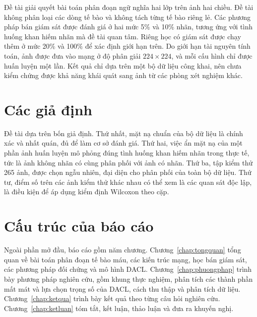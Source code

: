 Đề tài giải quyết bài toán phân đoạn ngữ nghĩa hai lớp trên ảnh hai chiều. Đề tài không phân loại các dòng tế bào và không tách từng tế bào riêng lẻ. Các phương pháp bán giám sát được đánh giá ở hai mức 5\% và 10\% nhãn, tương ứng với tình huống khan hiếm nhãn mà đề tài quan tâm. Riêng học có giám sát được chạy thêm ở mức 20\% và 100\% để xác định giới hạn trên. Do giới hạn tài nguyên tính toán, ảnh được đưa vào mạng ở độ phân giải $224\times224$, và mỗi cấu hình chỉ được huấn luyện một lần. Kết quả chỉ dựa trên một bộ dữ liệu công khai, nên chưa kiểm chứng được khả năng khái quát sang ảnh từ các phòng xét nghiệm khác.

\section{Các giả định}

Đề tài dựa trên bốn giả định. Thứ nhất, mặt nạ chuẩn của bộ dữ liệu là chính xác và nhất quán, đủ để làm cơ sở đánh giá. Thứ hai, việc ẩn mặt nạ của một phần ảnh huấn luyện mô phỏng đúng tình huống khan hiếm nhãn trong thực tế, tức là ảnh không nhãn có cùng phân phối với ảnh có nhãn. Thứ ba, tập kiểm thử 265 ảnh, được chọn ngẫu nhiên, đại diện cho phân phối của toàn bộ dữ liệu. Thứ tư, điểm số trên các ảnh kiểm thử khác nhau có thể xem là các quan sát độc lập, là điều kiện để áp dụng kiểm định Wilcoxon theo cặp.

\section{Cấu trúc của báo cáo}

Ngoài phần mở đầu, báo cáo gồm năm chương. Chương~\ref{chap:tongquan} tổng quan về bài toán phân đoạn tế bào máu, các kiến trúc mạng, học bán giám sát, các phương pháp đối chứng và mô hình DACL. Chương~\ref{chap:phuongphap} trình bày phương pháp nghiên cứu, gồm khung thực nghiệm, phân tích các thành phần mất mát và lựa chọn trọng số của DACL, cách thu thập và phân tích dữ liệu. Chương~\ref{chap:ketqua} trình bày kết quả theo từng câu hỏi nghiên cứu. Chương~\ref{chap:ketluan} tóm tắt, kết luận, thảo luận và đưa ra khuyến nghị.
